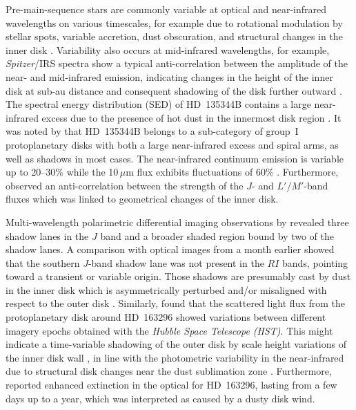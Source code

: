 \documentclass[twocolumn,tighten]{aastex61}
\begin{document}
Pre-main-sequence stars are commonly variable at optical and near-infrared wavelengths on various timescales, for example due to rotational modulation by stellar spots, variable accretion, dust obscuration, and structural changes in the inner disk \citep[e.g.,][]{eiroa2002}. Variability also occurs at mid-infrared wavelengths, for example, \emph{Spitzer}/IRS spectra show a typical anti-correlation between the amplitude of the near- and mid-infrared emission, indicating changes in the height of the inner disk at sub-au distance and consequent shadowing of the disk further outward \citep{espaillat2011}. The spectral energy distribution (SED) of HD~135344B contains a large near-infrared excess \citep[$F_{\rm NIR}/F_* = 0.27$;][]{garufi2017} due to the presence of hot dust in the innermost disk region \citep{brown2007}. It was noted by \citet{garufi2017} that HD~135344B belongs to a sub-category of group~I protoplanetary disks with both a large near-infrared excess and spiral arms, as well as shadows in most cases. The near-infrared continuum emission is variable up to 20--30\% while the 10\,$\mu$m flux exhibits fluctuations of 60\% \citep{grady2009,sitko2012}. Furthermore, \citet{grady2009} observed an anti-correlation between the strength of the $J$- and $L'$/$M'$-band fluxes which was linked to geometrical changes of the inner disk.

Multi-wavelength polarimetric differential imaging observations by \citet{stolker2016} revealed three shadow lanes in the $J$ band and a broader shaded region bound by two of the shadow lanes. A comparison with optical images from a month earlier showed that the southern $J$-band shadow lane was not present in the $RI$ bands, pointing toward a transient or variable origin. Those shadows are presumably cast by dust in the inner disk which is asymmetrically perturbed and/or misaligned with respect to the outer disk \citep{stolker2016}. Similarly, \citet{wisniewski2008} found that the scattered light flux from the protoplanetary disk around HD~163296 showed variations between different imagery epochs obtained with the \emph{Hubble Space Telescope (HST)}. This might indicate a time-variable shadowing of the outer disk by scale height variations of the inner disk wall \citep{wisniewski2008}, in line with the photometric variability in the near-infrared due to structural disk changes near the dust sublimation zone \citep{sitko2008}. Furthermore, \citet{ellerbroek2014} reported enhanced extinction in the optical for HD~163296, lasting from a few days up to a year, which was interpreted as caused by a dusty disk wind.
\end{document}
